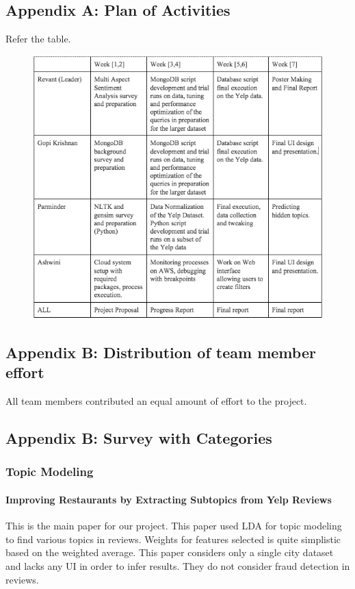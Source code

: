 \documentclass[12pt]{article} %
\begin{document}
\subsection{Appendix A: Plan of Activities}

Refer the table.

\begin{figure}[h]
\begin{center}
\includegraphics[width=6in]{act.png}
\end{center}
\end{figure}

\subsection{Appendix B: Distribution of team member effort}

All team members contributed an equal amount of effort to the project.

\subsection{Appendix B: Survey with Categories}

\subsubsection{Topic Modeling}

\paragraph{Improving Restaurants by Extracting Subtopics from Yelp Reviews}
This is the main paper for our project. This paper used LDA for topic modeling to find various topics in reviews. Weights for features selected is quite simplistic based on the weighted average. This paper considers only a single city dataset and lacks any UI in order to infer results. They do not consider fraud detection in reviews.
\end{document}
